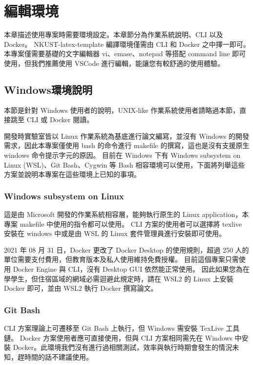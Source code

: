 \chapter{編輯環境} \label{ch_enviornment}

本章描述使用專案時需要環境設定。本章節分為作業系統說明、CLI 以及 Docker。
NKUST-latex-template 編譯環境僅需由 CLI 和 Docker 之中擇一即可。
本專案僅需要基礎的文字編輯器 vi、emase、notepad 等搭配 command line 即可使用，但我們推薦使用 VSCode 進行編輯，能讓您有較舒適的使用體驗。

\section{Windows環境說明}

本節是針對 Windows 使用者的說明，UNIX-like 作業系統使用者請略過本節，直接跳至 CLI 或 Docker 閱讀。

開發時實驗室皆以 Linux 作業系統為基底進行論文編寫，並沒有 Windows 的開發需求，因此本專案僅使用 bash 的命令進行 makefile 的撰寫，這也是沒有支援原生 windows 命令提示字元的原因。
目前在 Windows 下有 Windows subsystem on Linux (WSL)、Git Bash、Cygwin 等 Bash 相容環境可以使用，下面將列舉這些方案並說明本專案在這些環境上已知的事項。

\subsection{Windows subsystem on Linux}

這是由 Microsoft 開發的作業系統相容層，能夠執行原生的 Linux application，本專案 makefile 中使用的指令都可以使用。
CLI 方案的使用者可以選擇將 texlive 安裝在 windows 中或是由 WSL 的 Linux 套件管理員進行安裝即可使用。

2021 年 08 月 31 日，Docker 更改了 Docker Desktop 的使用規則，超過 250 人的單位需要支付費用，但教育版本及私人使用維持免費授權。
目前這個專案只需使用 Docker Engine 與 CLI，沒有 Desktop GUI 依然能正常使用。
因此如果您為在學學生，但住宿區域的網域必需迴避此規定時，請在 WSL2 的 Linux 上安裝 Docker 即可，並由 WSL2 執行 Docker 撰寫論文。

\subsection{Git Bash}

CLI 方案理論上可遷移至 Git Bash 上執行，但 Windows 需安裝 TexLive 工具鏈。
Docker 方案使用者應可直接使用，但與 CLI 方案相同需先在 Windows 中安裝 Docker。此環境我們沒有進行過相關測試，效率與執行時期會發生的情況未知，趕時間的話不建議使用。

